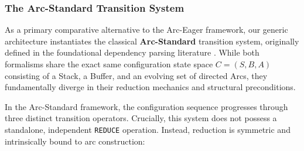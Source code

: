 \documentclass[12pt,a4paper]{article}
\begin{document}
\subsubsection{The Arc-Standard Transition System}
\label{subsubsec:arc_standard_system}

As a primary comparative alternative to the Arc-Eager framework, our generic architecture instantiates the classical \textbf{Arc-Standard} transition system, originally defined in the foundational dependency parsing literature \cite{nivre2003efficient}. While both formalisms share the exact same configuration state space $C = (S, B, A)$ consisting of a Stack, a Buffer, and an evolving set of directed Arcs, they fundamentally diverge in their reduction mechanics and structural preconditions.

In the Arc-Standard framework, the configuration sequence progresses through three distinct transition operators. Crucially, this system does not possess a standalone, independent \texttt{REDUCE} operation. Instead, reduction is symmetric and intrinsically bound to arc construction:
\end{document}
